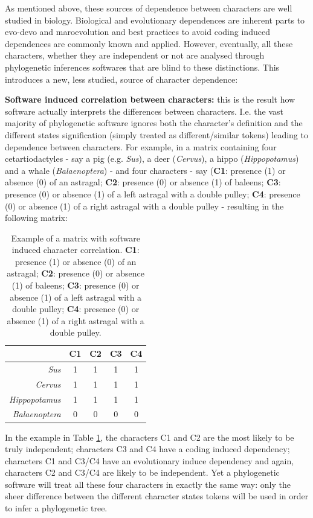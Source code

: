 \documentclass[12pt,letterpaper]{article}
\begin{document}
As mentioned above, these sources of dependence between characters are well studied in biology.
Biological and evolutionary dependences are inherent parts to evo-devo and maroevolution and best practices to avoid coding induced dependences are commonly known and applied.
However, eventually, all these characters, whether they are independent or not are analysed through phylogenetic inferences softwares that are blind to these distinctions.
This introduces a new, less studied, source of character dependence:

\noindent \textbf{Software induced correlation between characters:} this is the result how software actually interprets the differences between characters.
I.e. the vast majority of phylogenetic software ignores both the character's definition and the different states signification (simply treated as different/similar tokens) leading to dependence between characters.
For example, in a matrix containing four cetartiodactyles - say a pig (e.g. \textit{Sus}), a deer (\textit{Cervus}), a hippo (\textit{Hippopotamus}) and a whale (\textit{Balaenoptera}) - and four characters - say (\textbf{C1}: presence (1) or absence (0) of an astragal; \textbf{C2}: presence (0) or absence (1) of baleens; \textbf{C3}: presence (0) or absence (1) of a left astragal with a double pulley; \textbf{C4}: presence (0) or absence (1) of a right astragal with a double pulley - resulting in the following matrix:

\begin{table}
\center
    \begin{tabular}{r|cccc}
            & C1 & C2 & C3 & C4\\
        \hline
        \textit{Sus} & 1 & 1 & 1 & 1\\
        \textit{Cervus} & 1 & 1 & 1 & 1\\
        \textit{Hippopotamus} & 1 & 1 & 1 & 1\\
        \textit{Balaenoptera} & 0 & 0 & 0 & 0\\
    \end{tabular}
    \caption{Example of a matrix with software induced character correlation. \textbf{C1}: presence (1) or absence (0) of an astragal; \textbf{C2}: presence (0) or absence (1) of baleens; \textbf{C3}: presence (0) or absence (1) of a left astragal with a double pulley; \textbf{C4}: presence (0) or absence (1) of a right astragal with a double pulley.}
    \label{Tab:example_matrix}
\end{table}

In the example in Table \ref{Tab:example_matrix}, the characters C1 and C2 are the most likely to be truly independent; characters C3 and C4 have a coding induced dependency; characters C1 and C3/C4 have an evolutionary induce dependency and again, characters C2 and C3/C4 are likely to be independent.
Yet a phylogenetic software will treat all these four characters in exactly the same way: only the sheer difference between the different character states tokens will be used in order to infer a phylogenetic tree.
\end{document}
